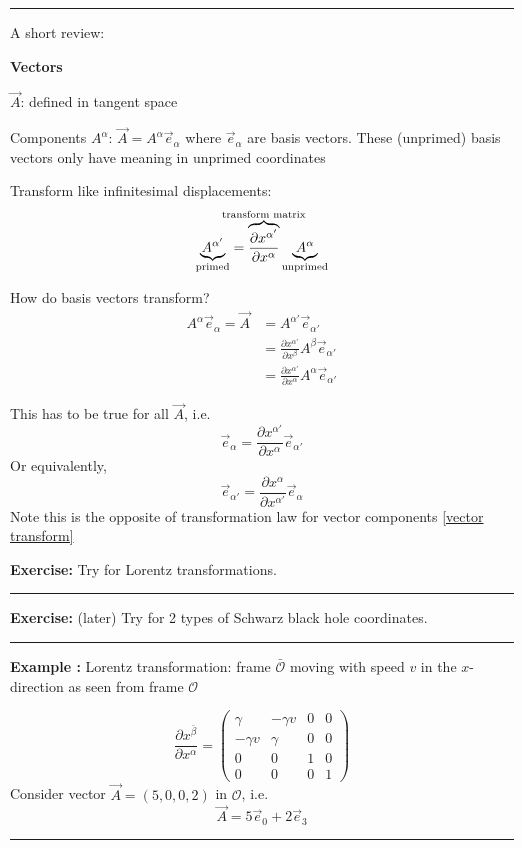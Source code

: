 \documentclass[a4paper]{article} %
\newcommand{\exercise}[2]
{
\begin{framed}
\textbf{Exercise:} #1 \\\hrule
#2
\end{framed}
}
\newcommand{\example}[2]
{
\begin{framed}
\textbf{Example #1:} #2
\end{framed}
}
\newcommand{\review}[1]
{
\hrule
A short review:

#1
\hrule
}
\newcommand{\pmx}[1]{
\begin{pmatrix}
#1
\end{pmatrix}
}
\begin{document}
\review{\textbf{Vectors}

$\vec{A}$: defined in tangent space

Components $A^\alpha$: $\vec{A}=A^\alpha \vec{e}_{\alpha}$ where $\vec{e}_{\alpha}$ are basis vectors. These (unprimed) basis vectors only have meaning in unprimed coordinates

Transform like infinitesimal displacements:
\begin{equation}
\underbrace{A^{\alpha'}}_{\text{primed}}=\overbrace{\frac{\partial x^{\alpha'}}{\partial x^{\alpha}}}^{\mathclap{\text{transform matrix}}}\underbrace{A^{\alpha}}_{\text{unprimed}}\label{vector transform}
\end{equation}

How do basis vectors transform?
\begin{align*}
A^{\alpha}\vec{e}_\alpha=\vec{A}&=A^{\alpha'}\vec{e}_{\alpha'}\\
&=\frac{\partial x^{\alpha'}}{\partial x^{\beta}}A^{\beta}\vec{e}_{\alpha'}	\\
&=\frac{\partial x^{\alpha'}}{\partial x^{\alpha}}A^{\alpha}\vec{e}_{\alpha'}
\end{align*}

This has to be true for all $\vec{A}$, i.e.
\begin{equation}
\vec{e}_{\alpha}=\frac{\partial x^{\alpha'}}{\partial x^{\alpha}}\vec{e}_{\alpha'}
\end{equation}
Or equivalently,
\begin{equation}
\vec{e}_{\alpha'}=\frac{\partial x^{\alpha}}{\partial x^{\alpha'}}\vec{e}_{\alpha}
\end{equation}
Note this is the opposite of transformation law for vector components \ref{vector transform}

\exercise{Try for Lorentz transformations.}{}
\exercise{(later) Try for 2 types of Schwarz black hole coordinates.}{}

\example{}{
Lorentz transformation: frame $\bar{\mathcal{O}}$ moving with speed $v$ in the $x$-direction as seen from frame $\mathcal{O}$

\begin{equation}
\frac{\partial x^{\bar{\beta}}}{\partial x^{\alpha}}=\pmx{\gamma&-\gamma v&0&0\\
-\gamma v&\gamma & 0&0\\ 0&0&1&0\\0&0&0&1}
\end{equation}
Consider vector $\vec{A}=(5,0,0,2)$ in $\mathcal{O}$, i.e.
\begin{equation}
\vec{A}=5\vec{e}_0 + 2\vec{e}_3
\end{equation}

}}
\end{document}
